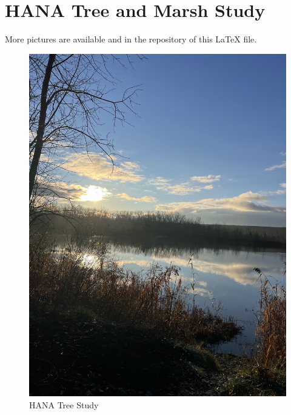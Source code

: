 \documentclass{article}
\begin{document}
\section{HANA Tree and Marsh Study}
\clearpage
More pictures are available and in the repository of this LaTeX file. 
\begin{figure}[h!]
\centering
\includegraphics[scale=.1]{Research/HANA/NOV2024/IMG_9791.JPG}
\caption{HANA Tree Study}
\label{fig:HANA}
\end{figure}
\end{document}

